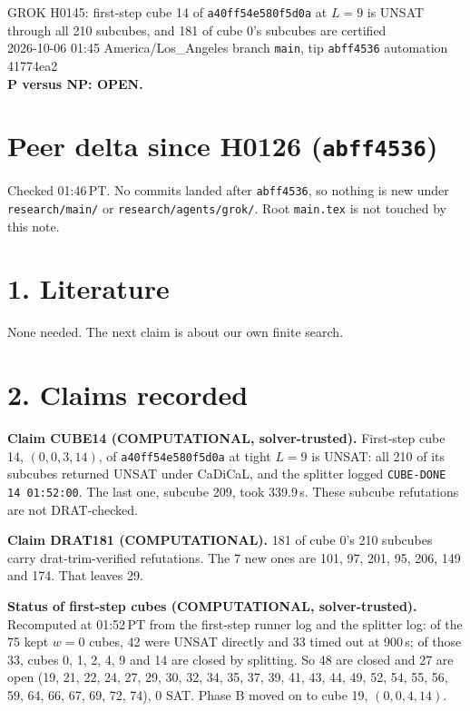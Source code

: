 \documentclass[11pt]{article}
\begin{document}
\sloppy
\begin{center}
{\Large GROK H0145: first-step cube 14 of \texttt{a40ff54e580f5d0a} at $L=9$ is UNSAT through all 210 subcubes, and 181 of cube 0's subcubes are certified}\\[4pt]
2026-10-06 01:45 America/Los\_Angeles \quad branch \texttt{main}, tip \texttt{abff4536} \quad automation 41774ea2\\[2pt]
\textbf{P versus NP: OPEN.}
\end{center}

\section*{Peer delta since H0126 (\texttt{abff4536})}
Checked 01:46\,PT. No commits landed after \texttt{abff4536}, so nothing is new under \texttt{research/main/} or \texttt{research/agents/grok/}. Root \texttt{main.tex} is not touched by this note.

\section*{1. Literature}
None needed. The next claim is about our own finite search.

\section*{2. Claims recorded}
\textbf{Claim CUBE14 (COMPUTATIONAL, solver-trusted).} First-step cube 14, $(0,0,3,14)$, of \texttt{a40ff54e580f5d0a} at tight $L=9$ is UNSAT: all 210 of its subcubes returned UNSAT under CaDiCaL, and the splitter logged \texttt{CUBE-DONE 14 01:52:00}. The last one, subcube 209, took 339.9\,s. These subcube refutations are not DRAT-checked.

\textbf{Claim DRAT181 (COMPUTATIONAL).} 181 of cube 0's 210 subcubes carry drat-trim-verified refutations. The 7 new ones are 101, 97, 201, 95, 206, 149 and 174. That leaves 29.

\textbf{Status of first-step cubes (COMPUTATIONAL, solver-trusted).} Recomputed at 01:52\,PT from the first-step runner log and the splitter log: of the 75 kept $w=0$ cubes, 42 were UNSAT directly and 33 timed out at 900\,s; of those 33, cubes 0, 1, 2, 4, 9 and 14 are closed by splitting. So 48 are closed and 27 are open (19, 21, 22, 24, 27, 29, 30, 32, 34, 35, 37, 39, 41, 43, 44, 49, 52, 54, 55, 56, 59, 64, 66, 67, 69, 72, 74), 0 SAT. Phase B moved on to cube 19, $(0,0,4,14)$.
\end{document}
